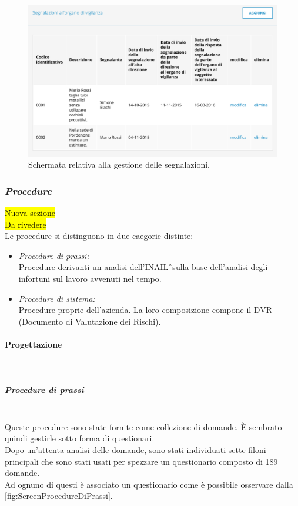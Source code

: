 	\begin{figure}[H]
		\begin{center}
			\includegraphics[width=12cm]{Pics/ScreenSegnalazioni.png}
			\caption{Schermata relativa alla gestione delle segnalazioni.}
			\label{fig:ScreenSegnalazioni}
		\end{center}
	\end{figure}
\newpage
\subsubsection{\textit{Procedure}}
\hl{Nuova sezione}\\
\hl{Da rivedere}\\
	Le procedure si distinguono in due caegorie distinte:
	\begin{itemize}
		\item \textit{Procedure di prassi:}	\\
			Procedure derivanti un analisi dell'\gls{INAIL}\G\ sulla base dell'analisi degli infortuni sul lavoro avvenuti nel tempo.
		\item \textit{Procedure di sistema:}\\
			Procedure proprie dell'azienda. La loro composizione compone il  \gls{DVR} (Documento di Valutazione dei Rischi).
	\end{itemize}

	\paragraph*{Progettazione}\mbox{}\\
		\subparagraph*{Procedure di prassi}\mbox{}\\
		Queste procedure sono state fornite come collezione di domande. È sembrato quindi gestirle sotto forma di questionari.\\
		Dopo un'attenta analisi delle domande, sono stati individuati sette filoni principali che sono stati usati per spezzare un questionario composto di 189 domande.\\
		Ad ognuno di questi è associato un questionario come è possibile osservare dalla \autoref{fig:ScreenProcedureDiPrassi}.
		
